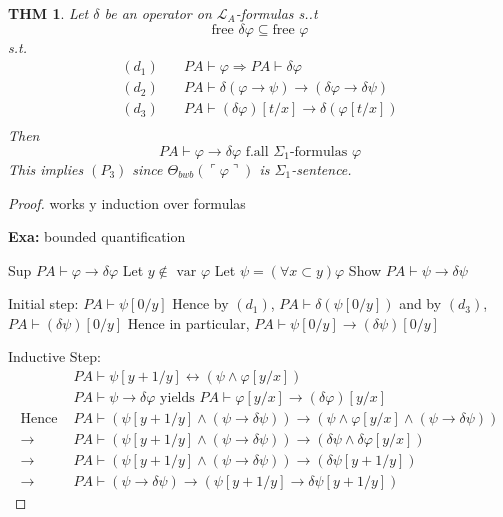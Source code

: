 \documentclass[12pt]{article}
\newcommand{\proves}{\vdash}
\newcommand{\gn}[1]{\ulcorner #1 \urcorner}
\begin{document}
\newtheorem*{blah}{THM}
\begin{blah}
  Let $\delta$ be an operator on $\mathcal{L}_A$-formulas s..t
  \[
  \text{free } \delta \varphi \subseteq \text{free } \varphi
  \]
  s.t.
\begin{align*}
  (d_1)& \quad 
  PA \proves \varphi  \Rightarrow PA \proves \delta\varphi \\
  (d_2)& \quad
  PA \proves \delta(\varphi \rightarrow \psi) \rightarrow
  (\delta\varphi \rightarrow \delta\psi) \\
  (d_3)& \quad
  PA \proves (\delta\varphi)[t/x]  \rightarrow \delta(\varphi[t/x]) \\
\end{align*}
Then 
\[
PA \proves \varphi \rightarrow \delta\varphi 
                \text{ f.all $\Sigma_1$-formulas } \varphi
\]
This implies $(P_3)$ since $\Theta_{bwb}(\gn{\varphi})$ is $\Sigma_1$-sentence.
\end{blah}
\begin{proof}
  works y induction over formulas

  \textbf{Exa:}
  bounded quantification

  Sup $PA \proves \varphi \rightarrow \delta\varphi$
  Let $y \not\in \text{ var } \varphi$
  Let $\psi = (\forall x \subset y) \varphi$
  Show $PA \proves \psi \rightarrow \delta\psi$

  Initial step: $PA \proves \psi[0/y]$
  Hence by $(d_1)$, $PA \proves \delta(\psi[0/y])$
  and by $(d_3)$, $PA \proves (\delta\psi)[0/y]$
  Hence in particular, $PA \proves \psi[0/y] \rightarrow (\delta\psi)[0/y]$

  Inductive Step:
  \begin{align*}
&   PA \proves \psi[y+1 / y] \leftrightarrow (\psi \wedge \varphi[y/x]) \\
&   PA \proves \psi \rightarrow \delta\varphi \text{ yields }
       PA \proves \varphi[y/x] \rightarrow (\delta\varphi)[y/x] \\
\text{Hence } 
&   PA \proves (\psi[y+1 / y] \wedge (\psi \rightarrow \delta\psi) )
       \rightarrow (\psi \wedge \varphi[y/x] \wedge 
                                (\psi \rightarrow \delta\psi)) \\
  \rightarrow
&   PA \proves (\psi[y+1 / y] \wedge (\psi \rightarrow \delta\psi) )
       \rightarrow (\delta\psi \wedge \delta\varphi[y/x]) \\
  \rightarrow
&   PA \proves (\psi[y+1 / y] \wedge (\psi \rightarrow \delta\psi) )
       \rightarrow (\delta\psi[y+1 / y]) \\
  \rightarrow
&   PA \proves (\psi \rightarrow \delta\psi) \rightarrow
            (\psi[y+1 / y] \rightarrow \delta\psi[y+1 / y])
  \end{align*}
\end{proof}
\end{document}
